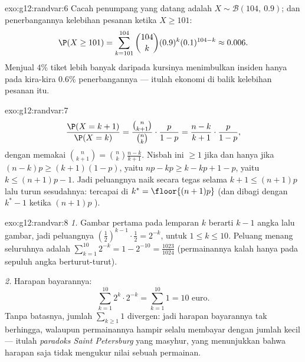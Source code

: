 \begin{solution}{exo:g12:randvar:6}
Cacah penumpang yang datang adalah $X \sim \mathcal B(104,\ 0.9)$; dan
penerbangannya kelebihan pesanan ketika $X \geq 101$:
\[
\P(X \geq 101) = \sum_{k=101}^{104}\binom{104}{k}(0.9)^k(0.1)^{104-k}
\approx 0.006 .
\]
Menjual $4\%$ tiket lebih banyak daripada kursinya menimbulkan insiden hanya pada kira-kira
$0.6\%$ penerbangannya --- itulah ekonomi di balik kelebihan pesanan itu.
\end{solution}

\begin{solution}{exo:g12:randvar:7}
\[
\frac{\P(X = k+1)}{\P(X = k)}
= \frac{\binom{n}{k+1}}{\binom nk}\cdot\frac{p}{1-p}
= \frac{n - k}{k + 1}\cdot\frac{p}{1-p},
\]
dengan memakai $\binom{n}{k+1} = \binom nk \frac{n-k}{k+1}$. Nisbah ini $\geq 1$
jika dan hanya jika $(n-k)p \geq (k+1)(1-p)$, yaitu $np - k p \geq k - kp + 1 - p$, yaitu
$k \leq (n+1)p - 1$. Jadi peluangnya naik secara tegas selama
$k + 1 \leq (n+1)p$ lalu turun sesudahnya:  tercapai di
$k^* = \floor{(n+1)p}$ (dan dibagi dengan $k^* - 1$ ketika $(n+1)p$ ).
\end{solution}

\begin{solution}{exo:g12:randvar:8}
\emph{1.} Gambar pertama pada lemparan $k$ berarti $k-1$ angka lalu gambar, jadi
peluangnya $\left(\frac12\right)^{k-1}\cdot\frac12 = 2^{-k}$, untuk
$1 \leq k \leq 10$. Peluang menang seluruhnya adalah
$\sum_{k=1}^{10} 2^{-k} = 1 - 2^{-10} = \frac{1023}{1024}$ (permainannya
kalah hanya pada sepuluh angka berturut-turut).

\emph{2.} Harapan bayarannya:
\[
\sum_{k=1}^{10} 2^k \cdot 2^{-k} = \sum_{k=1}^{10} 1 = 10 \text{ euro}.
\]
Tanpa batasnya, jumlah $\sum_{k\geq1} 1$ divergen: jadi harapan bayarannya
tak berhingga, walaupun permainannya hampir selalu membayar dengan jumlah kecil --- itulah
\emph{paradoks Saint Petersburg} yang masyhur, yang menunjukkan bahwa harapan saja tidak
mengukur nilai sebuah permainan.
\end{solution}

